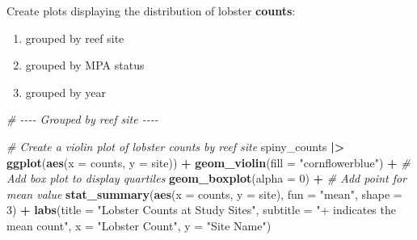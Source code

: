 \documentclass[
]{article}
\newenvironment{Shaded}{\begin{snugshade}}{\end{snugshade}}
\newcommand{\AttributeTok}[1]{\textcolor[rgb]{0.13,0.29,0.53}{#1}}
\newcommand{\CommentTok}[1]{\textcolor[rgb]{0.56,0.35,0.01}{\textit{#1}}}
\newcommand{\DecValTok}[1]{\textcolor[rgb]{0.00,0.00,0.81}{#1}}
\newcommand{\FunctionTok}[1]{\textcolor[rgb]{0.13,0.29,0.53}{\textbf{#1}}}
\newcommand{\NormalTok}[1]{#1}
\newcommand{\SpecialCharTok}[1]{\textcolor[rgb]{0.81,0.36,0.00}{\textbf{#1}}}
\newcommand{\StringTok}[1]{\textcolor[rgb]{0.31,0.60,0.02}{#1}}
\providecommand{\tightlist}{%
  \setlength{\itemsep}{0pt}\setlength{\parskip}{0pt}}
\begin{document}
Create plots displaying the distribution of lobster \textbf{counts}:

\begin{enumerate}
\def\labelenumi{\arabic{enumi})}
\tightlist
\item
  grouped by reef site\\
\item
  grouped by MPA status
\item
  grouped by year
\end{enumerate}

\begin{Shaded}
\begin{Highlighting}[]
\CommentTok{\# {-}{-}{-}{-} Grouped by reef site {-}{-}{-}{-}}

\CommentTok{\# Create a violin plot of lobster counts by reef site}
\NormalTok{spiny\_counts }\SpecialCharTok{|\textgreater{}} 
\FunctionTok{ggplot}\NormalTok{(}\FunctionTok{aes}\NormalTok{(}\AttributeTok{x =}\NormalTok{ counts, }\AttributeTok{y =}\NormalTok{ site)) }\SpecialCharTok{+}
  \FunctionTok{geom\_violin}\NormalTok{(}\AttributeTok{fill =} \StringTok{"cornflowerblue"}\NormalTok{) }\SpecialCharTok{+}
    \CommentTok{\# Add box plot to display quartiles}
    \FunctionTok{geom\_boxplot}\NormalTok{(}\AttributeTok{alpha =} \DecValTok{0}\NormalTok{) }\SpecialCharTok{+}
    \CommentTok{\# Add point for mean value}
    \FunctionTok{stat\_summary}\NormalTok{(}\FunctionTok{aes}\NormalTok{(}\AttributeTok{x =}\NormalTok{ counts, }\AttributeTok{y =}\NormalTok{ site),}
                 \AttributeTok{fun =} \StringTok{"mean"}\NormalTok{,}
                 \AttributeTok{shape =} \DecValTok{3}\NormalTok{) }\SpecialCharTok{+} 
    \FunctionTok{labs}\NormalTok{(}\AttributeTok{title =} \StringTok{"Lobster Counts at Study Sites"}\NormalTok{,}
         \AttributeTok{subtitle =} \StringTok{"+ indicates the mean count"}\NormalTok{,}
         \AttributeTok{x =} \StringTok{"Lobster Count"}\NormalTok{,}
         \AttributeTok{y =} \StringTok{"Site Name"}\NormalTok{)}
\end{Highlighting}
\end{Shaded}
\end{document}

